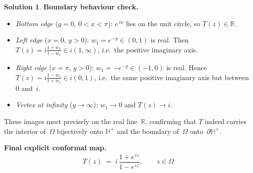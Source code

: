 \documentclass[12pt]{article}
\theoremstyle{definition} %
\newtheorem{solution}{Solution}
\theoremstyle{plain} %
\begin{document}
\begin{solution}
          \bigskip
          \textbf{Boundary behaviour check.}
          
          \begin{itemize}
            \item \emph{Bottom edge} ($y=0$, $0<x<\pi$):  
                  $e^{\,ix}$ lies on the unit circle,
                  so $T(z)\in\mathbb{R}$.
          
            \item \emph{Left edge} ($x=0$, $y>0$):  
                  $w_1=e^{-y}\in(0,1)$ is real.  
                  Then $T(z)=i\frac{1+w_1}{1-w_1}\in i(1,\infty)$, i.e.\ the
                  positive imaginary axis.
          
            \item \emph{Right edge} ($x=\pi$, $y>0$):  
                  $w_1=-e^{-y}\in(-1,0)$ is real.  
                  Hence $T(z)=i\frac{1-w_1}{1+w_1}\in i(0,1)$, i.e.\ the same
                  positive imaginary axis but between $0$ and~$i$.
          
            \item \emph{Vertex at infinity} ($y\to\infty$):  
                  $w_1\to0$ and $T(z)\to i$.
          \end{itemize}
          
          These images meet precisely on the real line~$\mathbb{R}$, confirming
          that $T$ indeed carries the interior of~$\Omega$ bijectively onto
          $\mathbb{H}^{+}$ and the boundary of~$\Omega$ onto~$\partial\mathbb{H}^{+}$.
          
          \bigskip
          \textbf{Final explicit conformal map.}
          \[
             \boxed{\;
               T(z)
               \;=\;
               i\,\frac{1+e^{\,i z}}{1-e^{\,i z}},
               \qquad z\in\Omega
             \;}
          \]
          \end{solution}
\end{document}
